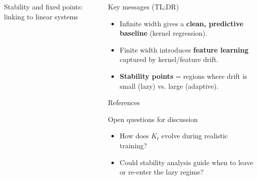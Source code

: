 \documentclass[final,12pt]{beamer}
\begin{document}
\begin{frame}[t]
\begin{columns}[t,totalwidth=\textwidth]
\begin{column}{.36\textwidth}
\begin{block}{Stability and fixed points: linking to linear systems}
			\end{block}

		\end{column}

		\begin{column}{.30\textwidth}
			\begin{block}{Key messages (TL;DR)}
				\begin{itemize}\setlength{\itemsep}{0.9ex}
					\item Infinite width gives a \textbf{clean, predictive baseline} (kernel regression).
					\item Finite width introduces \textbf{feature learning} captured by kernel/feature drift.
					\item \textbf{Stability points} = regions where drift is small (lazy) vs. large (adaptive).
				\end{itemize}
			\end{block}

			\begin{block}{References}
				\footnotesize
				
				
			\end{block}

			\begin{alertblock}{Open questions for discussion}
				\begin{itemize}\setlength{\itemsep}{0.8ex}
					\item How does \(K_t\) evolve during realistic training?
					\item Could stability analysis guide when to leave or re-enter the lazy regime?
				\end{itemize}
			\end{alertblock}
		\end{column}

	\end{columns}

\end{frame}
\end{document}
